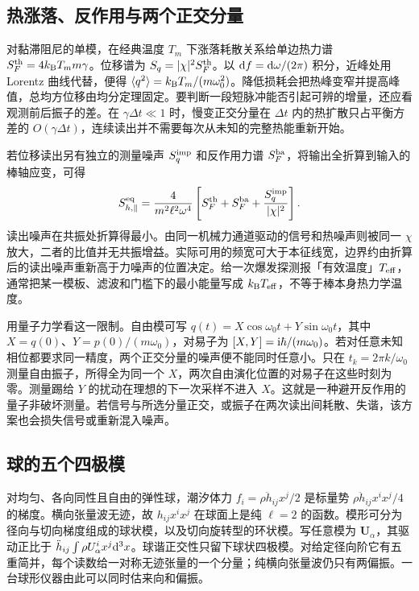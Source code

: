 \subsection{热涨落、反作用与两个正交分量}
对黏滞阻尼的单模，在经典温度 $T_m$ 下涨落耗散关系给单边热力谱 $S_F^{\rm th}=4k_{\rm B}T_m m\gamma$。位移谱为 $S_q=|\chi|^2 S_F^{\rm th}$。以 $\dd f=\dd\omega/(2\pi)$ 积分，近峰处用 Lorentz 曲线代替，便得 $\langle q^2\rangle=k_{\rm B}T_m/(m\omega_0^2)$。降低损耗会把热峰变窄并提高峰值，总均方位移由均分定理固定。要判断一段短脉冲能否引起可辨的增量，还应看观测前后振子的差。在 $\gamma\Delta t\ll1$ 时，慢变正交分量在 $\Delta t$ 内的热扩散只占平衡方差的 $O(\gamma\Delta t)$，连续读出并不需要每次从未知的完整热能重新开始。

若位移读出另有独立的测量噪声 $S_q^{\rm imp}$ 和反作用力谱 $S_F^{\rm ba}$，将输出全折算到输入的棒轴应变，可得
\[
 S_{h,\parallel}^{\rm eq}=\frac{4}{m^2\ell^2\omega^4}
 \left[S_F^{\rm th}+S_F^{\rm ba}
             +\frac{S_q^{\rm imp}}{|\chi|^2}\right].
\]
读出噪声在共振处折算得最小。由同一机械力通道驱动的信号和热噪声则被同一 $\chi$ 放大，二者的比值并无共振增益。实际可用的频宽可大于本征线宽，边界约由折算后的读出噪声重新高于力噪声的位置决定。给一次爆发探测报「有效温度」$T_{\rm eff}$，通常把某一模板、滤波和门槛下的最小能量写成 $k_{\rm B}T_{\rm eff}$，不等于棒本身热力学温度。

用量子力学看这一限制。自由模可写 $q(t)=X\cos\omega_0 t+Y\sin\omega_0t$，其中 $X=q(0)$、$Y=p(0)/(m\omega_0)$，对易子为 $[X,Y]=\mathrm{i}\hbar/(m\omega_0)$。若对任意未知相位都要求同一精度，两个正交分量的噪声便不能同时任意小。只在 $t_k=2\pi k/\omega_0$ 测量自由振子，所得全为同一个 $X$，两次自由演化位置的对易子在这些时刻为零。测量踢给 $Y$ 的扰动在理想的下一次采样不进入 $X$。这就是一种避开反作用的量子非破坏测量。若信号与所选分量正交，或振子在两次读出间耗散、失谐，该方案也会损失信号或重新混入噪声。

\subsection{球的五个四极模}
对均匀、各向同性且自由的弹性球，潮汐体力 $f_i=\rho\ddot h_{ij}x^j/2$ 是标量势 $\rho\ddot h_{ij}x^ix^j/4$ 的梯度。横向张量波无迹，故 $h_{ij}x^ix^j$ 在球面上是纯 $\ell=2$ 的函数。模形可分为径向与切向梯度组成的球状模，以及切向旋转型的环状模。写任意模为 $\bm U_\alpha$，其驱动正比于 $\ddot h_{ij}\int\rho U_\alpha^ix^j\dd^3x$。球谐正交性只留下球状四极模。对给定径向阶它有五重简并，每个读数给一对称无迹张量的一个分量；纯横向张量波仍只有两偏振。一台球形仪器由此可以同时估来向和偏振。

